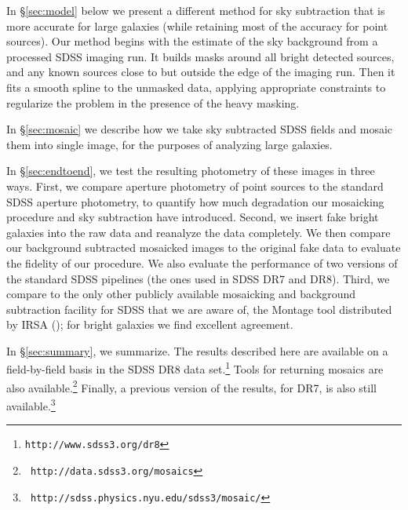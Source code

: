 \documentclass[10pt,preprint]{aastex}
\begin{document}
In \S\ref{sec:model} below we present a different method for sky
subtraction that is more accurate for large galaxies (while retaining
most of the accuracy for point sources). Our method begins with the
estimate of the sky background from a processed SDSS imaging run.  It
builds masks around all bright detected sources, and any known sources
close to but outside the edge of the imaging run. Then it fits a
smooth spline to the unmasked data, applying appropriate constraints
to regularize the problem in the presence of the heavy masking.

In \S\ref{sec:mosaic} we describe how we take sky subtracted SDSS
fields and mosaic them into single image, for the purposes of
analyzing large galaxies.  


In \S\ref{sec:endtoend}, we test the resulting photometry of these
images in three ways.  First, we compare aperture photometry of point
sources to the standard SDSS aperture photometry, to quantify how much
degradation our mosaicking procedure and sky subtraction have
introduced.
Second, we insert fake bright galaxies into the raw data and reanalyze
the data completely.  We then compare our background subtracted
mosaicked images to the original fake data to evaluate the fidelity of
our procedure. We also evaluate the performance of two versions of the
standard SDSS pipelines (the ones used in SDSS DR7 and DR8).
Third, we compare to the only other publicly available mosaicking and
background subtraction facility for SDSS that we are aware of, the
Montage tool distributed by IRSA (\citealt{berriman03a}); for bright
galaxies we find excellent agreement. 


In \S\ref{sec:summary}, we summarize. The results described here are
available on a field-by-field basis in the SDSS DR8 data
set.\footnote{\tt http://www.sdss3.org/dr8} Tools for returning
mosaics are also available.\footnote{{\tt
    http://data.sdss3.org/mosaics}} Finally, a previous version of the
results, for DR7, is also still available.\footnote{\tt
  http://sdss.physics.nyu.edu/sdss3/mosaic/}
\end{document}
